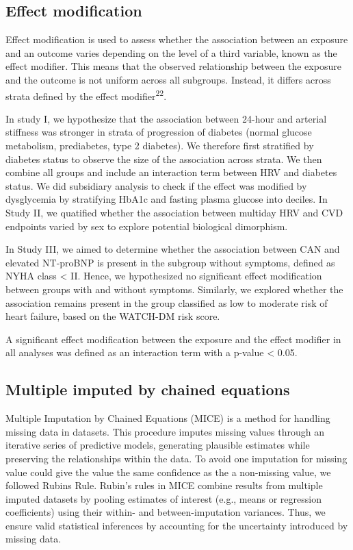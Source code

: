 \documentclass[
  a4paper,
  headsepline=true,
  open=any]{scrbook}
\begin{document}
\hypertarget{effect-modification}{%
\subsection{Effect modification}\label{effect-modification}}

Effect modification is used to assess whether the association between an
exposure and an outcome varies depending on the level of a third
variable, known as the effect modifier. This means that the observed
relationship between the exposure and the outcome is not uniform across
all subgroups. Instead, it differs across strata defined by the effect
modifier\textsuperscript{22}.

In study I, we hypothesize that the association between 24-hour and
arterial stiffness was stronger in strata of progression of diabetes
(normal glucose metabolism, prediabetes, type 2 diabetes). We therefore
first stratified by diabetes status to observe the size of the
association across strata. We then combine all groups and include an
interaction term between HRV and diabetes status. We did subsidiary
analysis to check if the effect was modified by dysglycemia by
stratifying HbA1c and fasting plasma glucose into deciles. In Study II,
we quatified whether the association between multiday HRV and CVD
endpoints varied by sex to explore potential biological dimorphism.

In Study III, we aimed to determine whether the association between CAN
and elevated NT-proBNP is present in the subgroup without symptoms,
defined as NYHA class \textless{} II. Hence, we hypothesized no
significant effect modification between groups with and without
symptoms. Similarly, we explored whether the association remains present
in the group classified as low to moderate risk of heart failure, based
on the WATCH-DM risk score.

A significant effect modification between the exposure and the effect
modifier in all analyses was defined as an interaction term with a
p-value \textless{} 0.05.

\hypertarget{multiple-imputed-by-chained-equations}{%
\subsection{Multiple imputed by chained
equations}\label{multiple-imputed-by-chained-equations}}

Multiple Imputation by Chained Equations (MICE) is a method for handling
missing data in datasets. This procedure imputes missing values through
an iterative series of predictive models, generating plausible estimates
while preserving the relationships within the data. To avoid one
imputation for missing value could give the value the same confidence as
the a non-missing value, we followed Rubins Rule. Rubin's rules in MICE
combine results from multiple imputed datasets by pooling estimates of
interest (e.g., means or regression coefficients) using their within-
and between-imputation variances. Thus, we ensure valid statistical
inferences by accounting for the uncertainty introduced by missing data.
\end{document}
